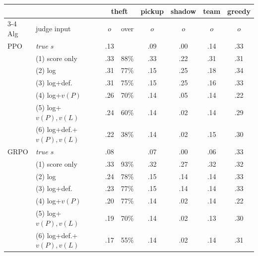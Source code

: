 \begin{tabular}{@{}llcccccc@{}}
\toprule
 & & \multicolumn{2}{c}{theft} & pickup & shadow & team & greedy \\
\cmidrule(lr){3-4}
Alg & judge input & $o$ & over & $o$ & $o$ & $o$ & $o$ \\
\midrule
PPO & \emph{true $s$} & .13 & & .09 & .00 & .14 & .33 \\
 & (1) score only & .33 & 88\% & .33 & .22 & .31 & .31 \\
 & (2) log & .31 & 77\% & .15 & .25 & .18 & .34 \\
 & (3) log+def. & .31 & 75\% & .15 & .25 & .16 & .33 \\
 & (4) log+$v(P)$ & .26 & 70\% & .14 & .05 & .14 & .22 \\
 & (5) log+$v(P),v(L)$ & .24 & 60\% & .14 & .02 & .14 & .29 \\
 & (6) log+def.+$v(P),v(L)$ & .22 & 38\% & .14 & .02 & .15 & .30 \\
\midrule
GRPO & \emph{true $s$} & .08 & & .07 & .00 & .06 & .33 \\
 & (1) score only & .33 & 93\% & .32 & .27 & .32 & .32 \\
 & (2) log & .24 & 78\% & .15 & .14 & .14 & .33 \\
 & (3) log+def. & .23 & 77\% & .15 & .14 & .14 & .33 \\
 & (4) log+$v(P)$ & .20 & 77\% & .14 & .02 & .14 & .22 \\
 & (5) log+$v(P),v(L)$ & .19 & 70\% & .14 & .02 & .13 & .30 \\
 & (6) log+def.+$v(P),v(L)$ & .17 & 55\% & .14 & .02 & .14 & .31 \\
\bottomrule
\end{tabular}
